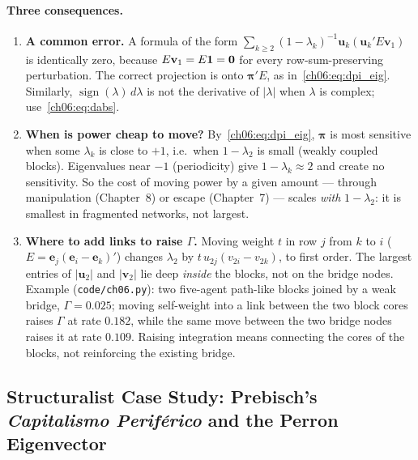 \documentclass[../structural_economics_book.tex]{subfiles}
\begin{document}
\paragraph{Three consequences.}
\begin{enumerate}
\item \textbf{A common error.} A formula of the form $\sum_{k\geq2}(1-\lambda_k)^{-1}\mathbf{u}_k(\mathbf{u}_k'E\mathbf{v}_1)$ is identically zero, because $E\mathbf{v}_1 = E\mathbf{1} = \mathbf{0}$ for every row-sum-preserving perturbation. The correct projection is onto $\boldsymbol{\pi}'E$, as in~\eqref{ch06:eq:dpi_eig}. Similarly, $\operatorname{sign}(\lambda)\,d\lambda$ is not the derivative of $|\lambda|$ when $\lambda$ is complex; use~\eqref{ch06:eq:dabs}.

\item \textbf{When is power cheap to move?} By~\eqref{ch06:eq:dpi_eig}, $\boldsymbol{\pi}$ is most sensitive when some $\lambda_k$ is close to $+1$, i.e.\ when $1 - \lambda_2$ is small (weakly coupled blocks). Eigenvalues near $-1$ (periodicity) give $1 - \lambda_k \approx 2$ and create no sensitivity. So the cost of moving power by a given amount --- through manipulation (Chapter~8) or escape (Chapter~7) --- scales \textit{with} $1 - \lambda_2$: it is smallest in fragmented networks, not largest.

\item \textbf{Where to add links to raise $\Gamma$.} Moving weight $t$ in row $j$ from $k$ to $i$ ($E = \mathbf{e}_j(\mathbf{e}_i - \mathbf{e}_k)'$) changes $\lambda_2$ by $t\,u_{2j}(v_{2i} - v_{2k})$, to first order. The largest entries of $|\mathbf{u}_2|$ and $|\mathbf{v}_2|$ lie deep \textit{inside} the blocks, not on the bridge nodes. Example (\texttt{code/ch06.py}): two five-agent path-like blocks joined by a weak bridge, $\Gamma = 0.025$; moving self-weight into a link between the two block cores raises $\Gamma$ at rate $0.182$, while the same move between the two bridge nodes raises it at rate $0.109$. Raising integration means connecting the cores of the blocks, not reinforcing the existing bridge.
\end{enumerate}


\subsection*{Structuralist Case Study: Prebisch's \textit{Capitalismo Perif\'{e}rico} and the Perron Eigenvector}
\end{document}
